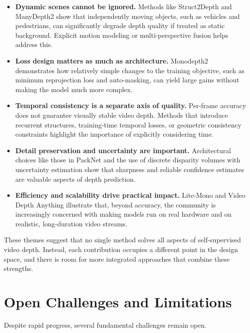 \documentclass[10pt,twocolumn,letterpaper]{article}
\begin{document}
\begin{itemize}
    \item \textbf{Dynamic scenes cannot be ignored.} Methods like Struct2Depth and ManyDepth2 show that independently moving objects, such as vehicles and pedestrians, can significantly degrade depth quality if treated as static background. Explicit motion modeling or multi-perspective fusion helps address this.

    \item \textbf{Loss design matters as much as architecture.} Monodepth2 demonstrates how relatively simple changes to the training objective, such as minimum reprojection loss and auto-masking, can yield large gains without making the model much more complex.

    \item \textbf{Temporal consistency is a separate axis of quality.} Per-frame accuracy does not guarantee visually stable video depth. Methods that introduce recurrent structures, training-time temporal losses, or geometric consistency constraints highlight the importance of explicitly considering time.

    \item \textbf{Detail preservation and uncertainty are important.} Architectural choices like those in PackNet and the use of discrete disparity volumes with uncertainty estimation show that sharpness and reliable confidence estimates are valuable aspects of depth prediction.

    \item \textbf{Efficiency and scalability drive practical impact.} Lite-Mono and Video Depth Anything illustrate that, beyond accuracy, the community is increasingly concerned with making models run on real hardware and on realistic, long-duration video streams.
\end{itemize}

These themes suggest that no single method solves all aspects of self-supervised video depth. Instead, each contribution occupies a different point in the design space, and there is room for more integrated approaches that combine these strengths.

\section{Open Challenges and Limitations}
\label{sec:challenges}

Despite rapid progress, several fundamental challenges remain open.
\end{document}
